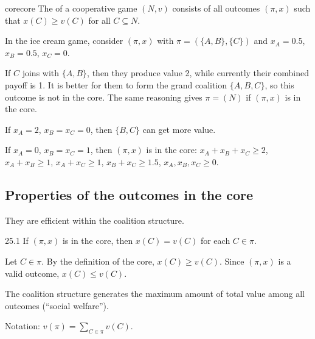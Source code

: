 \documentclass[12pt,letterpaper]{report}
\begin{document}
\begin{defn}{core}{core}
  The  of a cooperative game $(N, v)$ consists of all outcomes $(\pi, x)$ such that
  $x(C) \geq v(C)$ for all $C \subseteq N$.
\end{defn}

\begin{ex}
  In the ice cream game, consider $(\pi, x)$ with $\pi = (\{A, B\}, \{C\})$ and $x_A = 0.5$,
  $x_B = 0.5$, $x_C = 0$.

  If $C$ joins with $\{A, B\}$, then they produce value 2, while currently their combined payoff is
  1.
  It is better for them to form the grand coalition $\{A, B, C\}$, so this outcome is not in the
  core.
  The same reasoning gives $\pi = (N)$ if $(\pi, x)$ is in the core.

  If $x_A = 2$, $x_B = x_C = 0$, then $\{B, C\}$ can get more value.

  If $x_A = 0$, $x_B = x_C = 1$, then $(\pi, x)$ is in the core: $x_A + x_B + x_C \geq 2$,
  $x_A + x_B \geq 1$, $x_A + x_C \geq 1$, $x_B + x_C \geq 1.5$, $x_A, x_B, x_C \geq 0$.
\end{ex}

\subsection{Properties of the outcomes in the core}

\begin{enumcase}[start=1]
  \item They are efficient within the coalition structure.
\end{enumcase}

\begin{prop}{}{25.1}
  If $(\pi, x)$ is in the core, then $x(C) = v(C)$ for each $C \in \pi$.
\end{prop}

\begin{thmproof}
  Let $C \in \pi$.
  By the definition of the core, $x(C) \geq v(C)$.
  Since $(\pi, x)$ is a valid outcome, $x(C) \leq v(C)$.
\end{thmproof}

\begin{enumcase}[start=2]
  \item
  The coalition structure generates the maximum amount of total value among all outcomes (``social
  welfare'').

  Notation: $v(\pi) = \sum\limits_{C \in \pi} v(C)$.
\end{enumcase}
\end{document}
